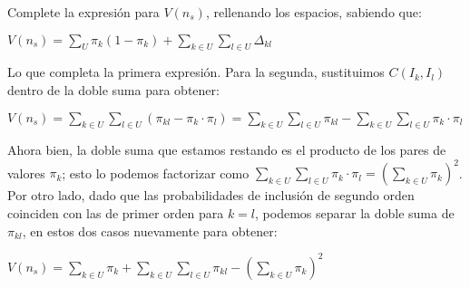 \documentclass[11pt]{article}
\begin{document}
\begin{question}
\begin{subquestion}{Complete la expresión para $V(n_s)$, rellenando los espacios, sabiendo que:}
{\begin{center}
$V(n_s) = \sum_U \pi_k (1-\pi_k) + \sum_{k\in{U}} \sum_{l\in{U}} \Delta_{kl}$
\end{center}

Lo que completa la primera expresión. Para la segunda, sustituimos $C(I_k, I_l)$ dentro de la doble suma para obtener: \\

\begin{center}
$V(n_s) = \sum_{k\in{U}} \sum_{l\in{U}} (\pi_{kl} - \pi_k \cdot \pi_l) = \sum_{k\in{U}} \sum_{l\in{U}} \pi_{kl} - \sum_{k\in{U}} \sum_{l\in{U}} \pi_k \cdot \pi_l$
\end{center}

Ahora bien, la doble suma que estamos restando es el producto de los pares de valores $\pi_k$; esto lo podemos factorizar como $\sum_{k\in{U}} \sum_{l\in{U}} \pi_k \cdot \pi_l = (\sum_{k\in{U}} \pi_k)^2$.\\

Por otro lado, dado que las probabilidades de inclusión de segundo orden coinciden con las de primer orden para $k=l$, podemos separar la doble suma de $\pi_{kl}$, en estos dos casos nuevamente para obtener:\\
\begin{center}
$V(n_s) = \sum_{k\in{U}} \pi_k + \sum_{k\in{U}} \sum_{l\in{U}} \pi_{kl} - (\sum_{k\in{U}} \pi_k)^2$
\end{center}
}

\end{subquestion}
\end{question}




\end{document}
